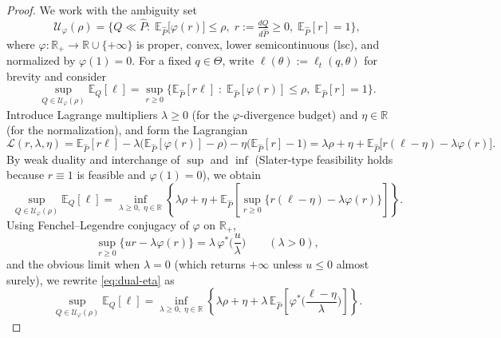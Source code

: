\documentclass[11pt]{article}
\theoremstyle{plain}
\theoremstyle{definition}
\theoremstyle{remark}
\begin{document}
\begin{proof}
We work with the ambiguity set
\[
\mathcal U_\varphi(\rho)
=\Big\{Q\ll\hat P:\;
\mathbb E_{\hat P}\big[\varphi(r)\big]\le\rho,\;
r:=\tfrac{dQ}{d\hat P}\ge0,\;
\mathbb E_{\hat P}[r]=1
\Big\},
\]
where $\varphi:\mathbb R_+\to\mathbb R\cup\{+\infty\}$ is proper, convex, lower semicontinuous (lsc), and normalized by $\varphi(1)=0$.
For a fixed $q\in\Theta$, write $\ell(\theta):=\ell_t(q,\theta)$ for brevity and consider
\[
\sup_{Q\in\mathcal U_\varphi(\rho)} \mathbb E_Q[\ell]
=\sup_{r\ge0}\Big\{
\mathbb E_{\hat P}[r\ell]\;:\;
\mathbb E_{\hat P}[\varphi(r)]\le\rho,\;\mathbb E_{\hat P}[r]=1
\Big\}.
\]
Introduce Lagrange multipliers $\lambda\ge0$ (for the $\varphi$-divergence budget) and $\eta\in\mathbb R$ (for the normalization), and form the Lagrangian
\[
\mathcal L(r,\lambda,\eta)
=\mathbb E_{\hat P}[r\ell]-\lambda\big(\mathbb E_{\hat P}[\varphi(r)]-\rho\big)
-\eta\big(\mathbb E_{\hat P}[r]-1\big)
=\lambda\rho+\eta+\mathbb E_{\hat P}\!\Big[r(\ell-\eta)-\lambda\varphi(r)\Big].
\]
By weak duality and interchange of $\sup$ and $\inf$ (Slater-type feasibility holds because $r\equiv1$ is feasible and $\varphi(1)=0$), we obtain
\begin{equation}\label{eq:dual-eta}
\sup_{Q\in\mathcal U_\varphi(\rho)} \mathbb E_Q[\ell]
=\inf_{\lambda\ge0,\;\eta\in\mathbb R}
\left\{
\lambda\rho+\eta
+\mathbb E_{\hat P}\!\left[\sup_{r\ge0}\big\{r(\ell-\eta)-\lambda\varphi(r)\big\}\right]
\right\}.
\end{equation}
Using Fenchel–Legendre conjugacy of $\varphi$ on $\mathbb R_+$,
\[
\sup_{r\ge0}\big\{ur-\lambda\varphi(r)\big\}
=\lambda\,\varphi^*\!\Big(\frac{u}{\lambda}\Big)\qquad(\lambda>0),
\]
and the obvious limit when $\lambda=0$ (which returns $+\infty$ unless $u\le0$ almost surely), we rewrite \eqref{eq:dual-eta} as
\begin{equation}\label{eq:dual-eta2}
\sup_{Q\in\mathcal U_\varphi(\rho)} \mathbb E_Q[\ell]
=\inf_{\lambda\ge0,\;\eta\in\mathbb R}
\left\{
\lambda\rho+\eta
+\lambda\,\mathbb E_{\hat P}\!\left[\varphi^*\!\Big(\frac{\ell-\eta}{\lambda}\Big)\right]
\right\}.
\end{equation}


\end{proof}
\end{document}
